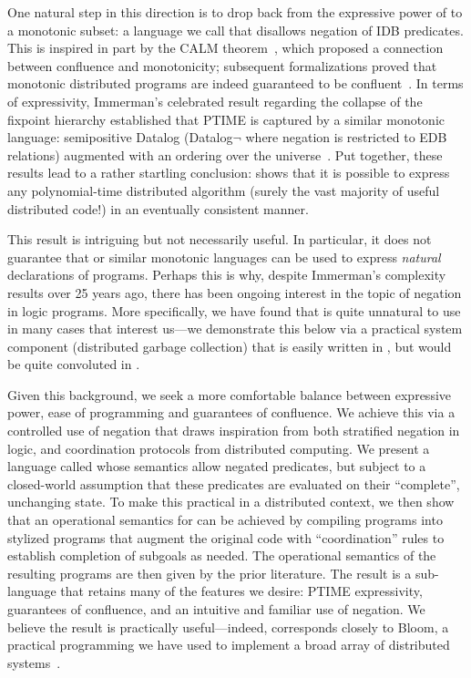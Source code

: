 One natural step in this direction is to drop back from the expressive power of \lang to a monotonic subset: a language we call \slang that disallows negation of IDB predicates.  This is inspired in part by the CALM theorem~\cite{cidr11, declarative-imperative}, which proposed a connection between confluence
and monotonicity; subsequent formalizations proved that monotonic distributed programs are indeed guaranteed to be confluent~\cite{Abiteboul2011,relational-transducers}.  
In terms of expressivity, Immerman's celebrated result regarding the collapse of the fixpoint hierarchy established that PTIME is captured by a similar monotonic language: semipositive Datalog (Datalog$\lnot$ where negation is restricted to EDB relations) augmented with an ordering over the universe~\cite{immerman-ptime}.  Put together, these results lead to a rather startling conclusion: \slang shows that it is possible to express any polynomial-time distributed algorithm (surely the vast majority of useful distributed code!) in an eventually consistent manner.

This result is intriguing but not necessarily useful.  In particular, it does not guarantee that \slang or similar monotonic languages can be used to express {\em natural} declarations of programs. Perhaps this is why, despite Immerman's complexity results over 25 years ago, there has been ongoing interest in the topic of negation in logic programs.  More specifically, we have found that \slang is quite unnatural to use in many cases that interest us---we demonstrate this below via a practical system component (distributed garbage collection) that is easily written in \lang, but would be quite convoluted in \slang.

Given this background, we seek a more comfortable balance between expressive power, ease of programming and guarantees of confluence.  We achieve this via a controlled use of negation that draws inspiration from both stratified negation in logic, and coordination protocols from distributed computing.  We present a language called \plang whose semantics allow negated predicates, but subject to a closed-world assumption that these predicates are evaluated on their ``complete'', unchanging state.  To make this practical in a distributed context, we then show that an operational semantics for \plang can be achieved by compiling \plang programs into stylized \lang programs that augment the original code with ``coordination'' rules to establish completion of subgoals as needed. The operational semantics of the resulting \lang programs are then given by the prior literature.  The result is a sub-language that retains many of the features we desire: PTIME expressivity, guarantees of confluence, and an intuitive and familiar use of negation.  We believe the result is practically useful---indeed, \plang corresponds closely to Bloom, a practical programming we have used to implement a broad array of distributed systems~\cite{bloom}.

